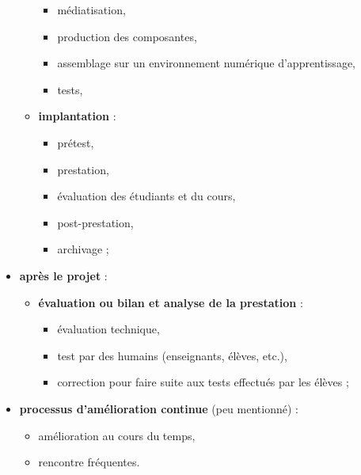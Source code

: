 \begin{frame}[allowframebreaks]
\begin{itemize}
\begin{itemize}
								\begin{itemize}
								\item médiatisation,
								\item production des composantes,
								\item assemblage sur un environnement numérique d'apprentissage,
								\item tests,
								\end{itemize}
							\framebreak
							\item \textbf{implantation} :
								\begin{itemize}
								\item prétest, 
								\item prestation,
								\item évaluation des étudiants et du cours,
								\item post-prestation,
								\item archivage ;
								\end{itemize}
							\end{itemize}
						\framebreak
						\item \textbf{après le projet} : 
							\begin{itemize}
							\item \textbf{évaluation ou bilan et analyse de la prestation} :
								\begin{itemize}
								\item évaluation technique,
								\item test par des humains (enseignants, élèves, etc.),
								\item correction pour faire suite aux tests effectués par les élèves ;
								\end{itemize}
							\end{itemize}	
						\item \textbf{processus d'amélioration continue} (peu mentionné) :
								\begin{itemize}
								\item amélioration au cours du temps, 
								\item rencontre fréquentes.
								\end{itemize}
						\end{itemize}		
							
						
					\end{frame}
							
						
